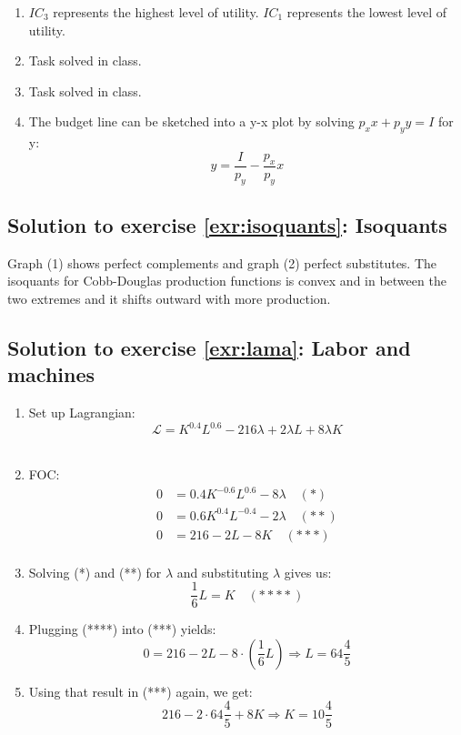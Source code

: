 \documentclass[
  12pt,
  oneside]{book}
\providecommand{\tightlist}{%
  \setlength{\itemsep}{0pt}\setlength{\parskip}{0pt}}
\theoremstyle{definition}
\theoremstyle{definition}
\theoremstyle{definition}
\theoremstyle{definition}
\theoremstyle{remark}
\begin{document}
\begin{enumerate}
\def\labelenumi{\alph{enumi})}
\tightlist
\item
  \(IC_3\) represents the highest level of utility. \(IC_1\) represents the lowest level of utility.\\
\item
  Task solved in class.
\item
  Task solved in class.
\item
  The budget line can be sketched into a y-x plot by solving \(p_xx+p_yy=I\) for y: \[y=\frac{I}{p_y}-\frac{p_x}{p_y}x\]
\end{enumerate}

\hypertarget{sol:isoquants}{%
\subsection*{Solution to exercise \ref{exr:isoquants}: Isoquants}\label{sol:isoquants}}

Graph (1) shows perfect complements and graph (2) perfect substitutes. The isoquants for Cobb-Douglas production functions is convex and in between the two extremes and it shifts outward with more production.

\hypertarget{sol:lama}{%
\subsection*{Solution to exercise \ref{exr:lama}: Labor and machines}\label{sol:lama}}

\begin{enumerate}
\def\labelenumi{\arabic{enumi}.}
\tightlist
\item
  Set up Lagrangian:
  \[\mathcal{L} = K^{0.4}L^{0.6} - 216\lambda + 2\lambda L + 8\lambda K\]\\
\item
  FOC:
  \begin{align*}
     0 &= 0.4K^{-0.6}L^{0.6} - 8\lambda \quad (*) \\
     0 &= 0.6K^{0.4}L^{-0.4} - 2\lambda \quad (**) \\
     0 &= 216 - 2L - 8K \quad (***) \\
  \end{align*}
\item
  Solving (*) and (**) for \(\lambda\) and substituting \(\lambda\) gives us:
  \[\frac{1}{6}L = K \quad (****)\]
\item
  Plugging (****) into (***) yields:
  \[0 = 216 - 2L - 8\cdot\left(\frac{1}{6}L\right) \Rightarrow L = 64\frac{4}{5}\]
\item
  Using that result in (***) again, we get:
  \[216 - 2\cdot 64\frac{4}{5} + 8K \Rightarrow K = 10\frac{4}{5}\]
\end{enumerate}
\end{document}
